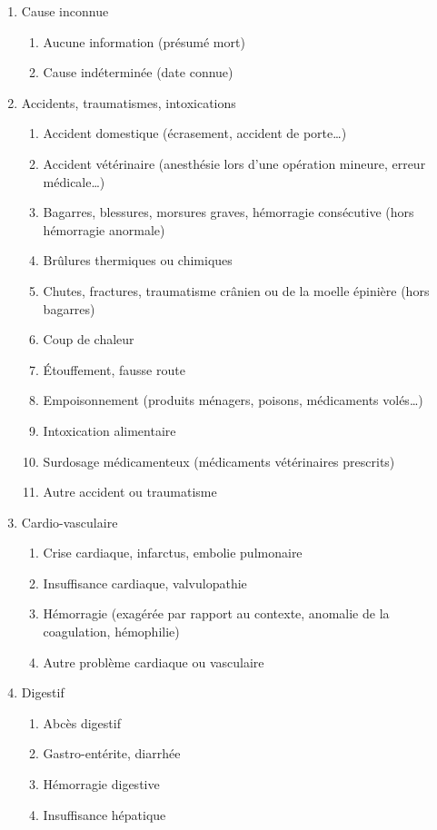 \documentclass[a4paper,10pt]{article}
\begin{document}
\begin{enumerate}
\item Cause inconnue
\begin{enumerate}
\item Aucune information (présumé mort)
\item Cause indéterminée (date connue)
\end{enumerate}
\item Accidents, traumatismes, intoxications
\begin{enumerate}
\item Accident domestique (écrasement, accident de porte…)
\item Accident vétérinaire (anesthésie lors d’une opération mineure, erreur médicale…)
\item Bagarres, blessures, morsures graves, hémorragie consécutive (hors hémorragie anormale)
\item Brûlures thermiques ou chimiques
\item Chutes, fractures, traumatisme crânien ou de la moelle épinière (hors bagarres)
\item Coup de chaleur
\item Étouffement, fausse route
\item Empoisonnement (produits ménagers, poisons, médicaments volés…)
\item Intoxication alimentaire
\item Surdosage médicamenteux (médicaments vétérinaires prescrits)
\item Autre accident ou traumatisme
\end{enumerate}
\item Cardio-vasculaire
\begin{enumerate}
\item Crise cardiaque, infarctus, embolie pulmonaire
\item Insuffisance cardiaque, valvulopathie
\item Hémorragie (exagérée par rapport au contexte, anomalie de la coagulation, hémophilie)
\item Autre problème cardiaque ou vasculaire
\end{enumerate}
\item Digestif
\begin{enumerate}
\item Abcès digestif
\item Gastro-entérite, diarrhée
\item Hémorragie digestive
\item Insuffisance hépatique

\end{enumerate}
\end{enumerate}
\end{document}
